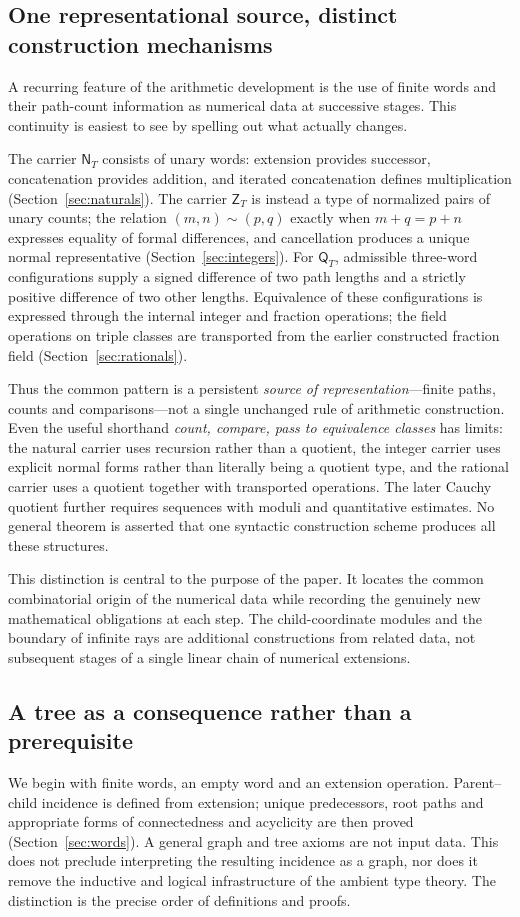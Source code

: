 \documentclass[11pt,reqno]{amsart}
\theoremstyle{definition}\newtheorem{definition}[theorem]{Definition}
\theoremstyle{remark}\newtheorem{remark}[theorem]{Remark}
\newcommand{\N}{\mathsf N_T}\newcommand{\Z}{\mathsf Z_T}\newcommand{\Q}{\mathsf Q_T}\newcommand{\RR}{\mathsf R}
\begin{document}
\subsection{One representational source, distinct construction mechanisms}
A recurring feature of the arithmetic development is the use of finite words and their path-count information as numerical data at successive stages. This continuity is easiest to see by spelling out what actually changes.

The carrier $\N$ consists of unary words: extension provides successor, concatenation provides addition, and iterated concatenation defines multiplication (Section~\ref{sec:naturals}). The carrier $\Z$ is instead a type of normalized pairs of unary counts; the relation $(m,n)\sim(p,q)$ exactly when $m+q=p+n$ expresses equality of formal differences, and cancellation produces a unique normal representative (Section~\ref{sec:integers}). For $\Q$, admissible three-word configurations supply a signed difference of two path lengths and a strictly positive difference of two other lengths. Equivalence of these configurations is expressed through the internal integer and fraction operations; the field operations on triple classes are transported from the earlier constructed fraction field (Section~\ref{sec:rationals}).

Thus the common pattern is a persistent \emph{source of representation}---finite paths, counts and comparisons---not a single unchanged rule of arithmetic construction. Even the useful shorthand \emph{count, compare, pass to equivalence classes} has limits: the natural carrier uses recursion rather than a quotient, the integer carrier uses explicit normal forms rather than literally being a quotient type, and the rational carrier uses a quotient together with transported operations. The later Cauchy quotient further requires sequences with moduli and quantitative estimates. No general theorem is asserted that one syntactic construction scheme produces all these structures.

This distinction is central to the purpose of the paper. It locates the common combinatorial origin of the numerical data while recording the genuinely new mathematical obligations at each step. The child-coordinate modules and the boundary of infinite rays are additional constructions from related data, not subsequent stages of a single linear chain of numerical extensions.

\subsection{A tree as a consequence rather than a prerequisite}
We begin with finite words, an empty word and an extension operation. Parent--child incidence is defined from extension; unique predecessors, root paths and appropriate forms of connectedness and acyclicity are then proved (Section~\ref{sec:words}). A general graph and tree axioms are not input data. This does not preclude interpreting the resulting incidence as a graph, nor does it remove the inductive and logical infrastructure of the ambient type theory. The distinction is the precise order of definitions and proofs.
\end{document}
